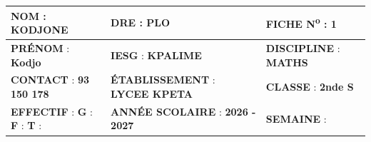 \documentclass[10pt]{article}
\begin{document}
\begin{tabular}{|p{8.6cm}|p{8.6cm}|p{8.6cm}|}
\hline
\textbf{NOM} \; : \; {\bfseries KODJONE} &
\textbf{DRE} \; : \; {\bfseries PLO} &
\textbf{FICHE N\textsuperscript{o}} \; : \; {\bfseries 1} \\ \hline
\textbf{PRÉNOM} \; : \; {\bfseries Kodjo} &
\textbf{IESG} \; : \; {\bfseries KPALIME} &
\textbf{DISCIPLINE} \; : \; {\bfseries MATHS} \\ \hline
\textbf{CONTACT} \; : \; {\bfseries 93 150 178} &
\textbf{ÉTABLISSEMENT} \; : \; {\bfseries LYCEE KPETA} &
\textbf{CLASSE} \; : \; {\bfseries 2nde S} \\ \hline
\textbf{EFFECTIF} \; : \; \textbf{G} : \dotfill \quad
                           \textbf{F} : \dotfill \quad
                           \textbf{T} : \dotfill &
\textbf{ANNÉE SCOLAIRE} \; : \; {\bfseries 2026 - 2027} &
\textbf{SEMAINE} \; : \; \dotfill \\ \hline
\end{tabular}
\end{document}
